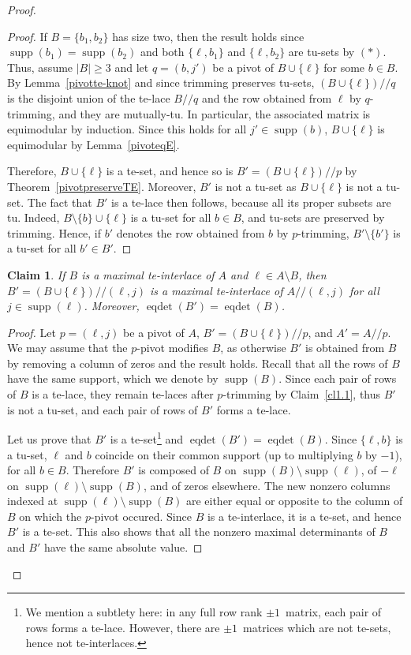 \documentclass[11pt,a4paper]{amsart}
\renewcommand*{\geq}{\geqslant}
\theoremstyle{plain}
\newtheorem{claimnumb}{Claim}[theorem]{\itshape}{\rmfamily}
\theoremstyle{definition}
\DeclareMathOperator{\supp}{supp}
\DeclareMathOperator{\eqdet}{eqdet}
\newcommand{\trim}{/\!\!/}
\begin{document}
\begin{proof}
\begin{proof}
If $B=\{b_1,b_2\}$ has size two, then the result holds since $\supp(b_1)=\supp(b_2)$ and both $\{\ell,b_1\}$ and $\{\ell,b_2\}$ are tu-sets by $(\ast)$.
Thus, assume $|B|\geq 3$ and let $q=(b,j')$ be a pivot of $B\cup\{\ell\}$ for some $b\in B$.
By Lemma~\ref{pivotte-knot} and since trimming preserves tu-sets, $(B\cup\{\ell\})/\!\!/q$ is the disjoint union of the te-lace $B\trim q$ and the row obtained from $\ell$ by $q$-trimming, and they are mutually-tu.
In particular, the associated matrix is equimodular by induction.
Since this holds for all $j'\in\supp(b)$, $B\cup\{\ell\}$ is equimodular by Lemma~\ref{pivoteqE}.

Therefore, $B\cup \{\ell\}$ is a te-set, and hence so is $B'=(B\cup \{\ell\})/\!\!/p$ by Theorem~\ref{pivotpreserveTE}.
Moreover, $B'$ is not a tu-set as $B\cup \{\ell\}$ is not a tu-set.
The fact that $B'$ is a te-lace then follows, because all its proper subsets are tu.
Indeed, $B\setminus\{b\}\cup\{\ell\}$ is a tu-set for all $b\in B$, and tu-sets are preserved by trimming.
Hence, if $b'$ denotes the row obtained from $b$ by $p$-trimming, $B'\setminus\{b'\}$ is a tu-set for all $b'\in B'$.
\end{proof}

\begin{claimnumb}\label{cl1.2}
If $B$ is a maximal te-interlace of $A$ and $\ell\in A\setminus B$, then $B'=(B\cup \{\ell\})\trim(\ell,j)$ is a maximal te-interlace of $A/\!\!/(\ell,j)$ for all $j\in\supp(\ell)$.
Moreover, $\eqdet(B')=\eqdet(B)$.
\end{claimnumb}
\begin{proof}
Let $p=(\ell,j)$ be a pivot of $A$, $B'=(B\cup \{\ell\})\trim p$, and $A'=A\trim p$.
We may assume that the $p$-pivot modifies $B$, as otherwise $B'$ is obtained from $B$ by removing a column of zeros and the result holds.
Recall that all the rows of $B$ have the same support, which we denote by $\supp(B)$.
Since each pair of rows of $B$ is a te-lace, they remain te-laces after $p$-trimming by Claim~\ref{cl1.1}, thus $B'$ is not a tu-set, and each pair of rows of $B'$ forms a te-lace.

Let us prove that $B'$ is a te-set\footnote{We mention a subtlety here: in any full row rank $\pm1$~matrix, each pair of rows forms a te-lace. However, there are $\pm1$~matrices which are not te-sets, hence not te-interlaces.} and $\eqdet(B')=\eqdet(B)$. Since $\{\ell,b\}$ is a tu-set, $\ell$ and $b$ coincide on their common support (up to multiplying $b$ by $-1$), for all $b\in B$.
Therefore $B'$ is composed of $B$ on $\supp(B)\setminus\supp(\ell)$, of $-\ell$ on $\supp(\ell)\setminus\supp(B)$, and of zeros elsewhere.
The new nonzero columns indexed at $\supp(\ell)\setminus\supp(B)$ are either equal or opposite to the column of $B$ on which the $p$-pivot occured.
Since $B$ is a te-interlace, it is a te-set, and hence $B'$ is a te-set.
This also shows that all the nonzero maximal determinants of $B$ and $B'$ have the same absolute value.


\end{proof}
\end{proof}
\end{document}
